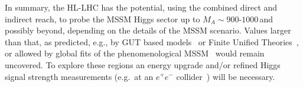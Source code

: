 In summary, the HL-LHC has the potential, using the combined direct and indirect reach, to probe the MSSM Higgs sector up to $M_A \sim 900$-$1000$\,\UGeV and possibly beyond, depending on the details of the MSSM scenario. Values larger than that, as predicted, e.g., by GUT based models~\cite{Buchmueller:2013rsa,Buchmueller:2014yva,Bechtle:2015nua,Bagnaschi:2016afc,Bagnaschi:2016xfg,Costa:2017gup} or Finite Unified Theories~\cite{Heinemeyer:2013nza,Heinemeyer:2018roq,Heinemeyer:2018zpw}, or allowed by global fits of the phenomenological MSSM~\cite{Bechtle:2016kui,Bagnaschi:2017tru} would remain uncovered. To explore these regions an energy upgrade and/or refined Higgs signal strength measurements (e.g.\ at an $e^+e^-$ collider~\cite{Moortgat-Picka:2015yla}) will be
necessary.